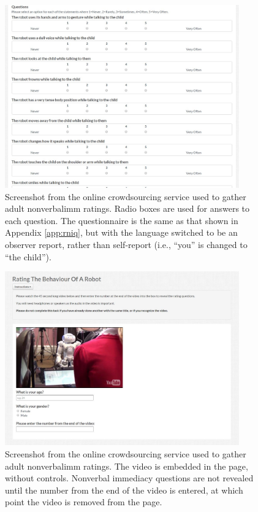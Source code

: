 \begin{figure}[ht]
    \centering
    \includegraphics[width=0.9\textwidth]{images/ch3_crowdsource_qs.jpg}
    \caption{Screenshot from the online crowdsourcing service used to gather adult \gls{nonverbalimm} ratings. Radio boxes are used for answers to each question. The questionnaire is the same as that shown in Appendix \ref{app:rniq}, but with the language switched to be an observer report, rather than self-report (i.e., ``you'' is changed to ``the child'').}
    \label{fig:ch3_crowdsource_qs}
\end{figure}

\begin{figure}[ht]
    \centering
    \includegraphics[width=0.9\textwidth]{images/ch3_crowdsource_vid.jpg}
    \caption{Screenshot from the online crowdsourcing service used to gather adult \gls{nonverbalimm} ratings. The video is embedded in the page, without controls. Nonverbal immediacy questions are not revealed until the number from the end of the video is entered, at which point the video is removed from the page.}
    \label{fig:ch3_crowdsource_vid}
\end{figure}

